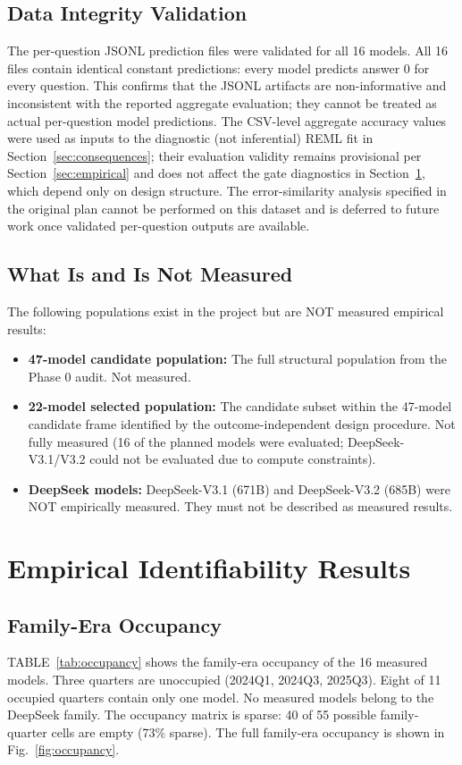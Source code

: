 \documentclass{ieeeaccess}
\theoremstyle{definition}
\theoremstyle{plain}
\begin{document}
\subsection{Data Integrity Validation}
The per-question JSONL prediction files were validated for all 16 models. All 16 files contain identical constant predictions: every model predicts answer 0 for every question. This confirms that the JSONL artifacts are non-informative and inconsistent with the reported aggregate evaluation; they cannot be treated as actual per-question model predictions. The CSV-level aggregate accuracy values were used as inputs to the diagnostic (not inferential) REML fit in Section~\ref{sec:consequences}; their evaluation validity remains provisional per Section~\ref{sec:empirical} and does not affect the gate diagnostics in Section~\ref{sec:empirical_results}, which depend only on design structure. The error-similarity analysis specified in the original plan cannot be performed on this dataset and is deferred to future work once validated per-question outputs are available.

\subsection{What Is and Is Not Measured}
The following populations exist in the project but are NOT measured empirical results:
\begin{itemize}
\item \textbf{47-model candidate population:} The full structural population from the Phase 0 audit. Not measured.
\item \textbf{22-model selected population:} The candidate subset within the 47-model candidate frame identified by the outcome-independent design procedure. Not fully measured (16 of the planned models were evaluated; DeepSeek-V3.1/V3.2 could not be evaluated due to compute constraints).
\item \textbf{DeepSeek models:} DeepSeek-V3.1 (671B) and DeepSeek-V3.2 (685B) were NOT empirically measured. They must not be described as measured results.
\end{itemize}

\section{Empirical Identifiability Results}
\label{sec:empirical_results}

\subsection{Family-Era Occupancy}
TABLE~\ref{tab:occupancy} shows the family-era occupancy of the 16 measured models. Three quarters are unoccupied (2024Q1, 2024Q3, 2025Q3). Eight of 11 occupied quarters contain only one model. No measured models belong to the DeepSeek family. The occupancy matrix is sparse: 40 of 55 possible family-quarter cells are empty (73\% sparse). The full family-era occupancy is shown in Fig.~\ref{fig:occupancy}.
\end{document}

